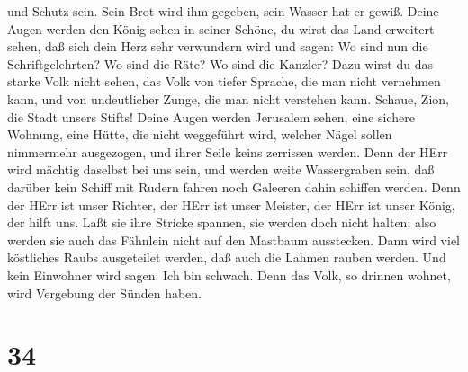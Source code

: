 und Schutz sein. Sein Brot wird ihm gegeben, sein Wasser hat er gewiß.
 Deine Augen werden den König sehen in seiner Schöne, du
wirst das Land erweitert sehen,  daß sich dein Herz sehr
verwundern wird und sagen: Wo sind nun die Schriftgelehrten? Wo sind die
Räte? Wo sind die Kanzler?  Dazu wirst du das starke Volk
nicht sehen, das Volk von tiefer Sprache, die man nicht vernehmen kann,
und von undeutlicher Zunge, die man nicht verstehen kann. 
Schaue, Zion, die Stadt unsers Stifts! Deine Augen werden Jerusalem
sehen, eine sichere Wohnung, eine Hütte, die nicht weggeführt wird,
welcher Nägel sollen nimmermehr ausgezogen, und ihrer Seile keins
zerrissen werden.  Denn der HErr wird mächtig daselbst bei
uns sein, und werden weite Wassergraben sein, daß darüber kein Schiff
mit Rudern fahren noch Galeeren dahin schiffen werden. 
Denn der HErr ist unser Richter, der HErr ist unser Meister, der HErr
ist unser König, der hilft uns.  Laßt sie ihre Stricke
spannen, sie werden doch nicht halten; also werden sie auch das Fähnlein
nicht auf den Mastbaum ausstecken. Dann wird viel köstliches Raubs
ausgeteilet werden, daß auch die Lahmen rauben werden.  Und
kein Einwohner wird sagen: Ich bin schwach. Denn das Volk, so drinnen
wohnet, wird Vergebung der Sünden haben.

\hypertarget{section-33}{%
\section{34}\label{section-33}}

